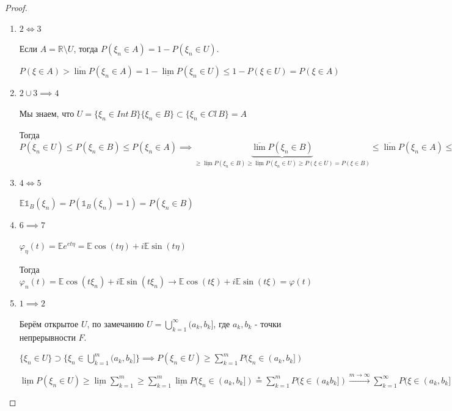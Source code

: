 \begin{proof}
    \begin{enumerate}
        \item {
            $2 \Longleftrightarrow 3$

            Если $A = \mathbb{R} \setminus U$, тогда $P(\xi_n \in A) = 1 - P(\xi_n \in U)$.

            $P(\xi \in A) > \overline{\lim} P(\xi_n \in A) = 1 - \underline{\lim} P(\xi_n \in U) \leqslant 1 - P(\xi \in U) = P(\xi \in A)$
        }
        \item {
            $2 \cup 3 \implies 4$

            Мы знаем, что $U = \{ \xi_n \in Int \, B \} \{ \xi_n \in B \} \subset \{ \xi_n \in Cl \, B \} = A$

            Тогда $P(\xi_n \in U) \leqslant P(\xi_n \in B) \leqslant P(\xi_n \in A) \implies \underbrace{\overline{\lim} P(\xi_n \in B)}_{\geqslant \underline{\lim} P(\xi_n \in B) \geqslant \underline{\lim} P(\xi_n \in U) \geqslant P(\xi \in U) = P(\xi \in B)} \leqslant \overline{\lim} P(\xi_n \in A) \leqslant P(\xi \in A) = P(\xi \in B)$
        }
        \item {
            $4 \Longleftrightarrow 5$

            $\mathbb{E} \mathds{1}_B (\xi_n) = P(\mathds{1}_B (\xi_n) = 1) = P(\xi_n \in B)$
        }
        \item {
            $6 \implies 7$

            $\varphi_{\eta} (t) = \mathbb{E} e^{et\eta} = \mathbb{E} \cos (t\eta) + i \mathbb{E} \sin (t \eta)$

            Тогда $\varphi_n(t) = \mathbb{E} \cos (t \xi_n) + i\mathbb{E} \sin (t\xi_n) \rightarrow \mathbb{E} \cos (t\xi) + i \mathbb{E} \sin (t\xi) = \varphi (t)$
        }
        \item {
            $1 \implies 2$

            Берём открытое $U$, по замечанию $U =  \bigcup\limits_{k = 1}^{\infty} (a_k, b_k]$, где $a_k, b_k$ - точки непрерывности $F$.

            $\{ \xi_n \in U \} \supset \{ \xi_n \in \bigcup\limits_{k = 1}^{m} (a_k, b_k] \} \implies P(\xi_n \in U) \geqslant \sum_{k = 1}^m P(\xi_n \in (a_k, b_k])$

            $\underline{\lim} P(\xi_n \in U) \geqslant \underline{\lim} \sum_{k  = 1}^m \geqslant \sum_{k = 1}^m \underline{\lim} P(\xi_n \in (a_k, b_k]) \overset{*}{=} \sum_{k = 1}^m P(\xi \in (a_k b_k]) \overset{m \to \infty}{\rightarrow} \sum_{k = 1}^{\infty} P(\xi \in (a_k, b_k]) = P(\xi \in U)$

}
\end{enumerate}
\end{proof}
